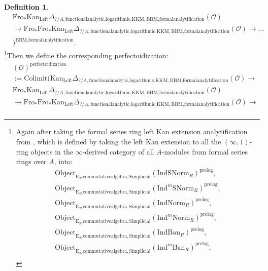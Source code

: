 \documentclass[11pt]{book}
\theoremstyle{definition}
\newtheorem{definition}[theorem]{Definition}
\numberwithin{equation}{section}
\begin{document}
\begin{definition}
\begin{align}
&\mathrm{Fro}_*\mathrm{Kan}_{\mathrm{Left}}\Delta_{?/A,\text{functionalanalytic,logarithmic,KKM},\text{BBM,formalanalytification}}(\mathcal{O})\\
&\longrightarrow \mathrm{Fro}_* \mathrm{Fro}_*\mathrm{Kan}_{\mathrm{Left}}\Delta_{?/A,\text{functionalanalytic,logarithmic,KKM},\text{BBM,formalanalytification}}(\mathcal{O})\longrightarrow...\\
&)^{\text{BBM,formalanalytification}}.	
\end{align}
\footnote{Again after taking the formal series ring left Kan extension analytification from \cite[Section 4.2]{BBM}, which is defined by taking the left Kan extension to all the $(\infty,1)$-ring objects in the $\infty$-derived category of all $A$-modules from formal series rings over $A$, into:
\begin{align}
\mathrm{Object}_{\mathrm{E}_\infty\mathrm{commutativealgebra},\mathrm{Simplicial}}(\mathrm{IndSNorm}_R)^{\text{prelog}},\\
\mathrm{Object}_{\mathrm{E}_\infty\mathrm{commutativealgebra},\mathrm{Simplicial}}(\mathrm{Ind}^m\mathrm{SNorm}_R)^{\text{prelog}},\\
\mathrm{Object}_{\mathrm{E}_\infty\mathrm{commutativealgebra},\mathrm{Simplicial}}(\mathrm{IndNorm}_R)^{\text{prelog}},\\
\mathrm{Object}_{\mathrm{E}_\infty\mathrm{commutativealgebra},\mathrm{Simplicial}}(\mathrm{Ind}^m\mathrm{Norm}_R)^{\text{prelog}},\\
\mathrm{Object}_{\mathrm{E}_\infty\mathrm{commutativealgebra},\mathrm{Simplicial}}(\mathrm{IndBan}_R)^{\text{prelog}},\\
\mathrm{Object}_{\mathrm{E}_\infty\mathrm{commutativealgebra},\mathrm{Simplicial}}(\mathrm{Ind}^m\mathrm{Ban}_R)^{\text{prelog}}.\\
\end{align}
}Then we define the corresponding perfectoidization:
\begin{align}
&(\mathcal{O})^{\text{perfectoidization}}\\
&:=\mathrm{Colimit}(\mathrm{Kan}_{\mathrm{Left}}\Delta_{?/A,\text{functionalanalytic,logarithmic,KKM},\text{BBM,formalanalytification}}(\mathcal{O})\longrightarrow \\
&\mathrm{Fro}_*\mathrm{Kan}_{\mathrm{Left}}\Delta_{?/A,\text{functionalanalytic,logarithmic,KKM},\text{BBM,formalanalytification}}(\mathcal{O})\\
&\longrightarrow \mathrm{Fro}_* \mathrm{Fro}_*\mathrm{Kan}_{\mathrm{Left}}\Delta_{?/A,\text{functionalanalytic,logarithmic,KKM},\text{BBM,formalanalytification}}(\mathcal{O})\longrightarrow\\

\end{align}
\end{definition}
\end{document}
